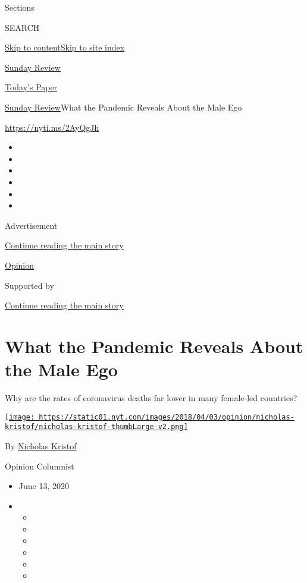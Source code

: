 Sections

SEARCH

\protect\hyperlink{site-content}{Skip to
content}\protect\hyperlink{site-index}{Skip to site index}

\href{https://www.nytimes.com/section/opinion/sunday}{Sunday Review}

\href{https://myaccount.nytimes.com/auth/login?response_type=cookie\&client_id=vi}{}

\href{https://www.nytimes.com/section/todayspaper}{Today's Paper}

\href{/section/opinion/sunday}{Sunday Review}\textbar{}What the Pandemic
Reveals About the Male Ego

\href{https://nyti.ms/2AyQgJh}{https://nyti.ms/2AyQgJh}

\begin{itemize}
\item
\item
\item
\item
\item
\item
\end{itemize}

Advertisement

\protect\hyperlink{after-top}{Continue reading the main story}

\href{/section/opinion}{Opinion}

Supported by

\protect\hyperlink{after-sponsor}{Continue reading the main story}

\hypertarget{what-the-pandemic-reveals-about-the-male-ego}{%
\section{What the Pandemic Reveals About the Male
Ego}\label{what-the-pandemic-reveals-about-the-male-ego}}

Why are the rates of coronavirus deaths far lower in many female-led
countries?

\href{https://www.nytimes.com/column/nicholas-kristof}{\texttt{[image: https://static01.nyt.com/images/2018/04/03/opinion/nicholas-kristof/nicholas-kristof-thumbLarge-v2.png]}}

By \href{https://www.nytimes.com/column/nicholas-kristof}{Nicholas
Kristof}

Opinion Columnist

\begin{itemize}
\item
  June 13, 2020
\item
  \begin{itemize}
  \item
  \item
  \item
  \item
  \item
  \item
  \end{itemize}
\end{itemize}

